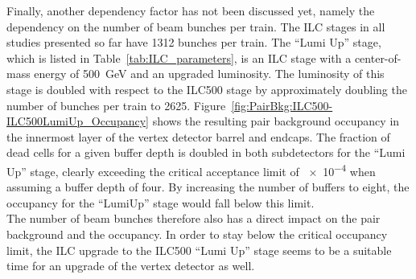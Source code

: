  Finally, another dependency factor has not been discussed yet, namely the dependency on the number of beam bunches per train.
The ILC stages in all studies presented so far have \num{1312} bunches per train.
The ``Lumi Up'' stage, which is listed in Table~\ref{tab:ILC_parameters}, is an ILC stage with a center-of-mass energy of \SI{500}{\GeV} and an upgraded luminosity.
The luminosity of this stage is doubled with respect to the ILC500 stage by approximately doubling the number of bunches per train to \num{2625}.
Figure~\ref{fig:PairBkg:ILC500-ILC500LumiUp_Occupancy} shows the resulting pair background occupancy in the innermost layer of the vertex detector barrel and endcaps.
The fraction of dead cells for a given buffer depth is doubled in both subdetectors for the ``Lumi Up'' stage, clearly exceeding the critical acceptance limit of \num{e-4} when assuming a buffer depth of four.
By increasing the number of buffers to eight, the occupancy for the ``LumiUp'' stage would fall below this limit.
\\The number of beam bunches therefore also has a direct impact on the pair background and the \sid occupancy.
In order to stay below the critical occupancy limit, the ILC upgrade to the ILC500 ``Lumi Up'' stage seems to be a suitable time for an upgrade of the \sid vertex detector as well.


